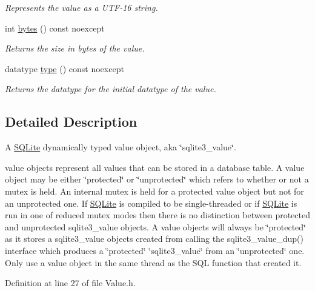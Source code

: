 \begin{DoxyCompactItemize}
\begin{DoxyCompactList}\small\item\em Represents the value as a U\-T\-F-\/16 string. \end{DoxyCompactList}\item 
int \hyperlink{a00015_a089b0cb550fd7ca7830ebf1cb43850d1}{bytes} () const noexcept
\begin{DoxyCompactList}\small\item\em Returns the size in bytes of the value. \end{DoxyCompactList}\item 
datatype \hyperlink{a00015_a1dbe99607518010c9fd134b0816bb451}{type} () const noexcept
\begin{DoxyCompactList}\small\item\em Returns the datatype for the initial datatype of the value. \end{DoxyCompactList}\end{DoxyCompactItemize}


\subsection{Detailed Description}
A \hyperlink{a00038}{S\-Q\-Lite} dynamically typed value object, aka \char`\"{}sqlite3\-\_\-value\char`\"{}. 

value objects represent all values that can be stored in a database table. A value object may be either \char`\"{}protected\char`\"{} or \char`\"{}unprotected\char`\"{} which refers to whether or not a mutex is held. An internal mutex is held for a protected value object but not for an unprotected one. If \hyperlink{a00038}{S\-Q\-Lite} is compiled to be single-\/threaded or if \hyperlink{a00038}{S\-Q\-Lite} is run in one of reduced mutex modes then there is no distinction between protected and unprotected sqlite3\-\_\-value objects. A value objects will always be \char`\"{}protected\char`\"{} as it stores a sqlite3\-\_\-value objects created from calling the sqlite3\-\_\-value\-\_\-dup() interface which produces a \char`\"{}protected\char`\"{} \char`\"{}sqlite3\-\_\-value\char`\"{} from an \char`\"{}unprotected\char`\"{} one. Only use a value object in the same thread as the S\-Q\-L function that created it. 

Definition at line 27 of file Value.\-h.



